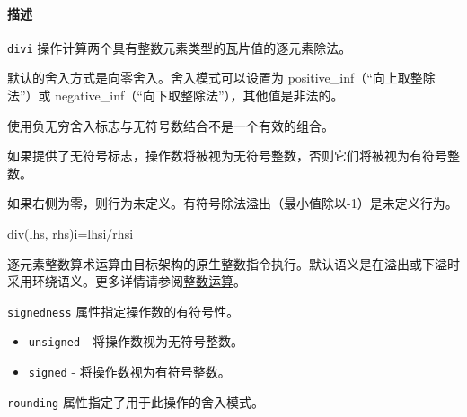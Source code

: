 \documentclass{article}
\begin{document}
\begin{itemize}
\paragraph{描述}


\end{itemize}
\texttt{divi} 操作计算两个具有整数元素类型的瓦片值的逐元素除法。



默认的舍入方式是向零舍入。舍入模式可以设置为 positive\_inf（``向上取整除法''）或 negative\_inf（``向下取整除法''），其他值是非法的。



使用负无穷舍入标志与无符号数结合不是一个有效的组合。



如果提供了无符号标志，操作数将被视为无符号整数，否则它们将被视为有符号整数。



如果右侧为零，则行为未定义。有符号除法溢出（最小值除以-1）是未定义行为。



div(lhs, rhs)i=lhsi/rhsi


逐元素整数算术运算由目标架构的原生整数指令执行。默认语义是在溢出或下溢时采用环绕语义。更多详情请参阅\href{https://docs.nvidia.com/cuda/tile-ir/latest/sections/operations.html#op-group-integer}{整数运算}。



\texttt{signedness} 属性指定操作数的有符号性。



\begin{itemize}
\item \texttt{unsigned} - 将操作数视为无符号整数。
\item \texttt{signed} - 将操作数视为有符号整数。


\end{itemize}
\texttt{rounding} 属性指定了用于此操作的舍入模式。
\end{document}
